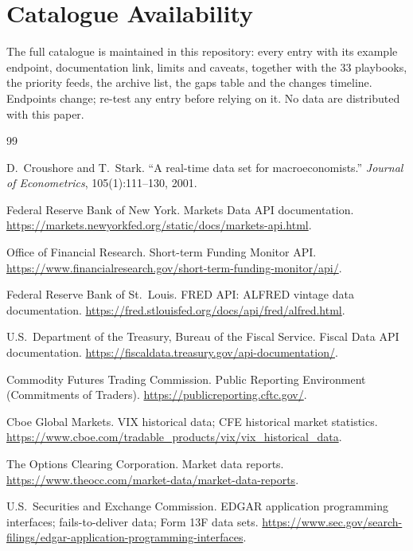 \documentclass[10pt, a4paper, twocolumn]{article}
\begin{document}
\section*{Catalogue Availability}

The full catalogue is maintained in this repository: every entry with its example endpoint, documentation link, limits and caveats, together with the 33 playbooks, the priority feeds, the archive list, the gaps table and the changes timeline. Endpoints change; re-test any entry before relying on it. No data are distributed with this paper.

\begin{thebibliography}{99}
\small\raggedright

D.~Croushore and T.~Stark.
\newblock ``A real-time data set for macroeconomists.''
\newblock \textit{Journal of Econometrics}, 105(1):111--130, 2001.

Federal Reserve Bank of New York.
\newblock Markets Data API documentation.
\newblock \url{https://markets.newyorkfed.org/static/docs/markets-api.html}.

Office of Financial Research.
\newblock Short-term Funding Monitor API.
\newblock \url{https://www.financialresearch.gov/short-term-funding-monitor/api/}.

Federal Reserve Bank of St.\ Louis.
\newblock FRED API: ALFRED vintage data documentation.
\newblock \url{https://fred.stlouisfed.org/docs/api/fred/alfred.html}.

U.S.\ Department of the Treasury, Bureau of the Fiscal Service.
\newblock Fiscal Data API documentation.
\newblock \url{https://fiscaldata.treasury.gov/api-documentation/}.

Commodity Futures Trading Commission.
\newblock Public Reporting Environment (Commitments of Traders).
\newblock \url{https://publicreporting.cftc.gov/}.

Cboe Global Markets.
\newblock VIX historical data; CFE historical market statistics.
\newblock \url{https://www.cboe.com/tradable_products/vix/vix_historical_data}.

The Options Clearing Corporation.
\newblock Market data reports.
\newblock \url{https://www.theocc.com/market-data/market-data-reports}.

U.S.\ Securities and Exchange Commission.
\newblock EDGAR application programming interfaces; fails-to-deliver data; Form 13F data sets.
\newblock \url{https://www.sec.gov/search-filings/edgar-application-programming-interfaces}.


\end{thebibliography}
\end{document}
